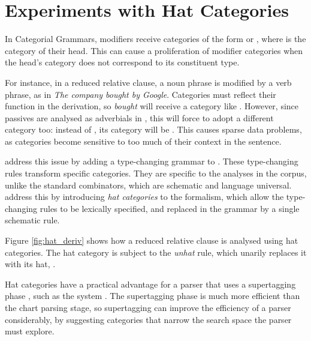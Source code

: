 \documentclass[11pt]{article}
\begin{document}
\section{Experiments with Hat Categories}



In Categorial Grammars, modifiers receive categories of the form 
or , where  is the category of their head. This can cause a
proliferation of modifier categories when the head's category does not
correspond to its constituent type.

For instance, in a reduced relative clause, a noun phrase is modified by a
verb phrase, as in \emph{The company bought by Google}. Categories must
reflect their function in the derivation, so \emph{bought} will receive
a category like . However, since passives are analysed
as adverbials in \ccgbank, this will force  to adopt a different
category too: instead of , its category
will be . This causes sparse data problems,
as categories become sensitive to too much of their context in the
sentence.

\citet{hock:cl07} address this issue by adding a type-changing grammar
to \ccgbank. These type-changing rules transform specific categories.
They are specific to the analyses in the corpus,
unlike the standard combinators, which are schematic and language universal.
\citet{honnibal:09} address this by introducing \emph{hat categories} to the
formalism, which allow the type-changing rules to be lexically specified,
and replaced in the grammar by a single schematic rule.

Figure \ref{fig:hat_deriv} shows how a reduced relative clause is analysed
using hat categories. The hat category 
is subject to the \emph{unhat} rule, which unarily replaces it
with its hat, .

Hat categories have a practical advantage for a parser that uses a supertagging
phase \citep{srinivas:99}, such as the \candc system \citep{clark:cl07}.
The supertagging phase is much more efficient than the chart parsing stage,
so supertagging can improve the efficiency of a parser considerably, by
suggesting categories that narrow the search space the parser must explore.
\end{document}
